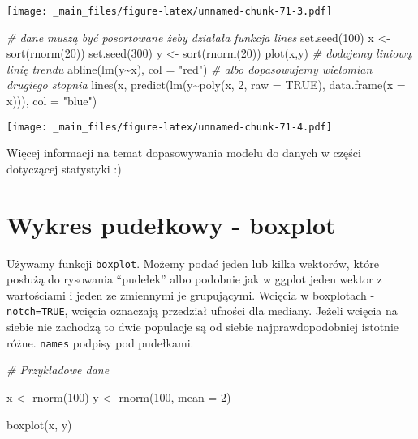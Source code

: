 \documentclass[
]{book}
\newenvironment{Shaded}{\begin{snugshade}}{\end{snugshade}}
\newcommand{\AttributeTok}[1]{\textcolor[rgb]{0.77,0.63,0.00}{#1}}
\newcommand{\CommentTok}[1]{\textcolor[rgb]{0.56,0.35,0.01}{\textit{#1}}}
\newcommand{\ConstantTok}[1]{\textcolor[rgb]{0.00,0.00,0.00}{#1}}
\newcommand{\DecValTok}[1]{\textcolor[rgb]{0.00,0.00,0.81}{#1}}
\newcommand{\FunctionTok}[1]{\textcolor[rgb]{0.00,0.00,0.00}{#1}}
\newcommand{\NormalTok}[1]{#1}
\newcommand{\OtherTok}[1]{\textcolor[rgb]{0.56,0.35,0.01}{#1}}
\newcommand{\SpecialCharTok}[1]{\textcolor[rgb]{0.00,0.00,0.00}{#1}}
\newcommand{\StringTok}[1]{\textcolor[rgb]{0.31,0.60,0.02}{#1}}
\begin{document}
\texttt{[image: \_main\_files/figure-latex/unnamed-chunk-71-3.pdf]}

\begin{Shaded}
\begin{Highlighting}[]
\CommentTok{\# dane muszą być posortowane żeby działała funkcja lines}
\FunctionTok{set.seed}\NormalTok{(}\DecValTok{100}\NormalTok{)}
\NormalTok{x }\OtherTok{\textless{}{-}} \FunctionTok{sort}\NormalTok{(}\FunctionTok{rnorm}\NormalTok{(}\DecValTok{20}\NormalTok{))}
\FunctionTok{set.seed}\NormalTok{(}\DecValTok{300}\NormalTok{)}
\NormalTok{y }\OtherTok{\textless{}{-}} \FunctionTok{sort}\NormalTok{(}\FunctionTok{rnorm}\NormalTok{(}\DecValTok{20}\NormalTok{))}
\FunctionTok{plot}\NormalTok{(x,y)}
\CommentTok{\# dodajemy liniową linię trendu}
\FunctionTok{abline}\NormalTok{(}\FunctionTok{lm}\NormalTok{(y}\SpecialCharTok{\textasciitilde{}}\NormalTok{x), }\AttributeTok{col =} \StringTok{"red"}\NormalTok{)}
\CommentTok{\# albo dopasowujemy wielomian drugiego stopnia}
\FunctionTok{lines}\NormalTok{(x, }\FunctionTok{predict}\NormalTok{(}\FunctionTok{lm}\NormalTok{(y}\SpecialCharTok{\textasciitilde{}}\FunctionTok{poly}\NormalTok{(x, }\DecValTok{2}\NormalTok{, }\AttributeTok{raw =} \ConstantTok{TRUE}\NormalTok{), }\FunctionTok{data.frame}\NormalTok{(}\AttributeTok{x =}\NormalTok{ x))), }\AttributeTok{col =} \StringTok{"blue"}\NormalTok{)}
\end{Highlighting}
\end{Shaded}

\texttt{[image: \_main\_files/figure-latex/unnamed-chunk-71-4.pdf]}

Więcej informacji na temat dopasowywania modelu do danych w części dotyczącej statystyki :)

\hypertarget{wykres-pudeux142kowy---boxplot-1}{%
\section{Wykres pudełkowy - boxplot}\label{wykres-pudeux142kowy---boxplot-1}}

Używamy funkcji \texttt{boxplot}. Możemy podać jeden lub kilka wektorów, które posłużą do rysowania ``pudełek'' albo podobnie jak w ggplot jeden wektor z wartościami i jeden ze zmiennymi je grupującymi. Wcięcia w boxplotach - \texttt{notch=TRUE}, wcięcia oznaczają przedział ufności dla mediany. Jeżeli wcięcia na siebie nie zachodzą to dwie populacje są od siebie najprawdopodobniej istotnie różne. \texttt{names} podpisy pod pudełkami.

\begin{Shaded}
\begin{Highlighting}[]
\CommentTok{\# Przykładowe dane}

\NormalTok{x }\OtherTok{\textless{}{-}} \FunctionTok{rnorm}\NormalTok{(}\DecValTok{100}\NormalTok{)}
\NormalTok{y }\OtherTok{\textless{}{-}} \FunctionTok{rnorm}\NormalTok{(}\DecValTok{100}\NormalTok{, }\AttributeTok{mean =} \DecValTok{2}\NormalTok{)}

\FunctionTok{boxplot}\NormalTok{(x, y)}
\end{Highlighting}
\end{Shaded}
\end{document}

